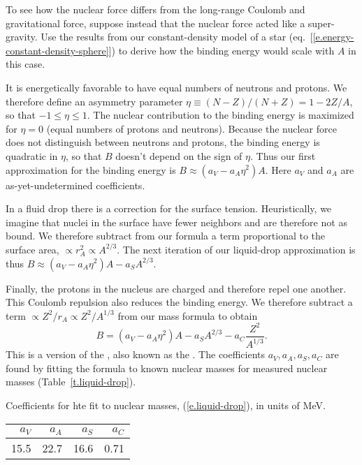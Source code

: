 \begin{exercisebox}
To see how the nuclear force differs from the long-range Coulomb and gravitational force, suppose instead that the nuclear force acted like a super-gravity. Use the results from our constant-density model of a star (eq.~[\ref{e.energy-constant-density-sphere}]) to derive how the binding energy would scale with $A$ in this case.
\end{exercisebox}

It is energetically favorable to have equal numbers of neutrons and protons. We therefore define an asymmetry parameter $\eta \equiv (N-Z)/(N+Z) = 1-2Z/A$, so that $-1\le\eta\le1$. The nuclear contribution to the binding energy is maximized for $\eta = 0$ (equal numbers of protons and neutrons). Because the nuclear force does not distinguish between neutrons and protons, the binding energy is quadratic in $\eta$, so that $B$ doesn't depend on the sign of $\eta$. Thus our first approximation for the binding energy is $B \approx (a_{V} - a_{A}\eta^{2}) A$. Here $a_{V}$ and $a_{A}$ are as-yet-undetermined coefficients.

In a fluid drop there is a correction for the surface tension. Heuristically, we imagine that nuclei in the surface have fewer neighbors and are therefore not as bound. We therefore subtract from our formula a term proportional to the surface area, $\propto r_{A}^{2} \propto A^{2/3}$. The next iteration of our liquid-drop approximation is thus $B \approx (a_{V}- a_{A}\eta^{2})A - a_{S}A^{2/3} $.

Finally, the protons in the nucleus are charged and therefore repel one another. This Coulomb repulsion also reduces the binding energy. We therefore subtract a term $\propto Z^{2}/r_{A}\propto Z^{2}/A^{1/3}$ from our mass formula to obtain
\begin{equation}\label{e.liquid-drop}
B = \left(a_{V} -a_{A}\eta^{2}\right) A -  a_{S}A^{2/3} - a_{C} \frac{Z^{2}}{A^{1/3}}. 
\end{equation}
This is a version of the , also known as the .
The coefficients $a_{V},a_{A},a_{S},a_{C}$ are found by fitting the formula to known nuclear masses
for measured nuclear masses (Table~\ref{t.liquid-drop}).
\begin{margintable}
\caption[Liquid-drop coefficients]{\label{t.liquid-drop} Coefficients for hte fit to nuclear masses, (\protect\ref{e.liquid-drop}), in units of MeV.}
\begin{tabular}{rrrr}
$a_V$ & $a_A$ & $a_S$ & $a_C$ \\
\hline
15.5 & 22.7 & 16.6 & 0.71\\
\end{tabular}
\end{margintable}

